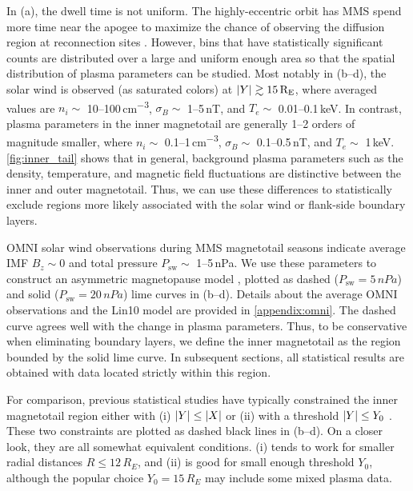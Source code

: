 \documentclass[draft]{agujournal2019}
\begin{document}
In (a), the dwell time is not uniform. The highly-eccentric orbit has MMS spend more time near the apogee to maximize the chance of observing the diffusion region at reconnection sites \cite{Fuselier2016}. However, bins that have statistically significant counts are distributed over a large and uniform enough area so that the spatial distribution of plasma parameters can be studied. Most notably in (b--d), the solar wind is observed (as saturated colors) at ${\abs{Y}\gtrsim15\,\si{R_E}}$, where averaged values are ${n_i\sim}$ 10--100\,\si{cm\tothe{-3}}, ${\sigma_B\sim}$ 1--5\,\si{nT}, and ${T_e\sim}$ 0.01--0.1\,\si{keV}. In contrast, plasma parameters in the inner magnetotail are generally 1--2 orders of magnitude smaller, where ${n_i\sim}$ 0.1--1\,\si{cm\tothe{-3}}, ${\sigma_B\sim}$ 0.1--0.5\,\si{nT}, and ${T_e\sim}$ 1\,\si{keV}. \cref{fig:inner_tail} shows that in general, background plasma parameters such as the density, temperature, and magnetic field fluctuations are distinctive between the inner and outer magnetotail. Thus, we can use these differences to statistically exclude regions more likely associated with the solar wind or flank-side boundary layers.

OMNI solar wind observations during MMS magnetotail seasons indicate average IMF ${B_z\sim0}$ and total pressure ${P_\text{sw}\sim}$ 1--5\,\si{nPa}. We use these parameters to construct an asymmetric magnetopause model \cite{Lin2010}, plotted as dashed (${P_\text{sw}=5\,\si{nPa}}$) and solid (${P_\text{sw}=20\,\si{nPa}}$) lime curves in (b--d). Details about the average OMNI observations and the Lin10 model are provided in \ref{appendix:omni}. The dashed curve agrees well with the change in plasma parameters. Thus, to be conservative when eliminating boundary layers, we define the inner magnetotail as the region bounded by the solid lime curve. In subsequent sections, all statistical results are obtained with data located strictly within this region.

For comparison, previous statistical studies have typically constrained the inner magnetotail region either with (i) ${\abs{Y}\leq\abs{X}}$ \cite{Ergun2015} or (ii) with a threshold ${\abs{Y}\leq Y_0}$ \cite{Boakes2014,Chong2022}. These two constraints are plotted as dashed black lines in (b--d). On a closer look, they are all somewhat equivalent conditions. (i) tends to work for smaller radial distances ${R\leq12\,\si{R_E}}$, and (ii) is good for small enough threshold $Y_0$, although the popular choice ${Y_0=15\,\si{R_E}}$ may include some mixed plasma data. 
\end{document}
